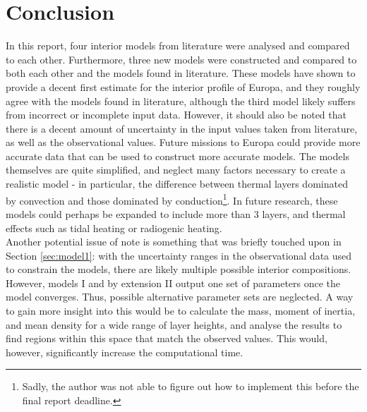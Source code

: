 \documentclass[twocolumn]{article}
\begin{document}
\section{Conclusion}
In this report, four interior models from literature were analysed and compared to each other. Furthermore, three new models were constructed and compared to both each other and the models found in literature. These models have shown to provide a decent first estimate for the interior profile of Europa, and they roughly agree with the models found in literature, although the third model likely suffers from incorrect or incomplete input data. However, it should also be noted that there is a decent amount of uncertainty in the input values taken from literature, as well as the observational values. Future missions to Europa could provide more accurate data that can be used to construct more accurate models. The models themselves are quite simplified, and neglect many factors necessary to create a realistic model - in particular, the difference between thermal layers dominated by convection and those dominated by conduction\footnote{Sadly, the author was not able to figure out how to implement this before the final report deadline.}. In future research, these models could perhaps be expanded to include more than 3 layers, and thermal effects such as tidal heating or radiogenic heating.\\
Another potential issue of note is something that was briefly touched upon in Section \ref{sec:model1}: with the uncertainty ranges in the observational data used to constrain the models, there are likely multiple possible interior compositions. However, models I and by extension II output one set of parameters once the model converges. Thus, possible alternative parameter sets are neglected. A way to gain more insight into this would be to calculate the mass, moment of inertia, and mean density for a wide range of layer heights, and analyse the results to find regions within this space that match the observed values. This would, however, significantly increase the computational time.



\end{document}
